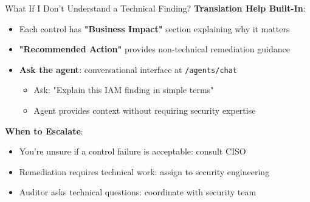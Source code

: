 \documentclass[aspectratio=169]{beamer}
\begin{document}
\begin{frame}{What If I Don't Understand a Technical Finding?}
  \textbf{Translation Help Built-In}:
  
  \vspace{0.3cm}
  
  \begin{itemize}
    \item Each control has \textbf{"Business Impact"} section explaining why it matters
    \item \textbf{"Recommended Action"} provides non-technical remediation guidance
    \item \textbf{Ask the agent}: conversational interface at \texttt{/agents/chat}
      \begin{itemize}
        \item Ask: "Explain this IAM finding in simple terms"
        \item Agent provides context without requiring security expertise
      \end{itemize}
  \end{itemize}
  
  \vspace{0.3cm}
  
  \textbf{When to Escalate}:
  \begin{itemize}
    \item You're unsure if a control failure is acceptable: consult CISO
    \item Remediation requires technical work: assign to security engineering
    \item Auditor asks technical questions: coordinate with security team
  \end{itemize}
\end{frame}
\end{document}
